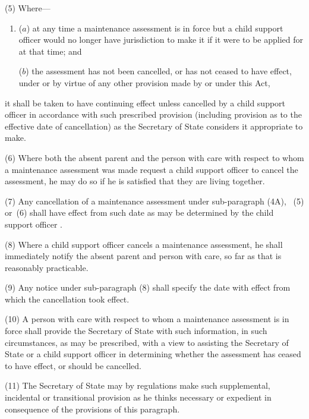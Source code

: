 \documentclass[12pt,a4paper]{article}
\begin{document}
(5) Where—
\begin{enumerate}\item[]
($a$) at any time a maintenance assessment is in force but a child support officer would no longer have jurisdiction to make it if it were to be applied for at that time; and

($b$) the assessment has not been cancelled, or has not ceased to have effect, under or by virtue of any other provision made by or under this Act,
\end{enumerate}
it shall be taken to have continuing effect unless cancelled by 
a child support officer 
in accordance with such prescribed provision (including provision as to the effective date of cancellation) as the Secretary of State considers it appropriate to make.

(6) Where both the absent parent and the person with care with respect to whom a maintenance assessment was made request 
a child support officer 
to cancel the assessment, he may do so if he is satisfied that they are living together.

(7) Any cancellation of a maintenance assessment under sub-paragraph 
(4A),~%
(5)  or~(6)  shall have effect from such date as may be determined by 
the child support officer%
.

(8) Where 
a child support officer 
cancels a maintenance assessment, he shall immediately notify the absent parent and person with care, so far as that is reasonably practicable.

(9) Any notice under sub-paragraph (8)  shall specify the date with effect from which the cancellation took effect.

(10) A person with care with respect to whom a maintenance assessment is in force shall provide the Secretary of State with such information, in such circumstances, as may be prescribed, with a view to assisting the Secretary of State 
or a child support officer  %
in determining whether the assessment has ceased to have effect, or should be cancelled.

(11) The Secretary of State may by regulations make such supplemental, incidental or transitional provision as he thinks necessary or expedient in consequence of the provisions of this paragraph.
\end{document}
